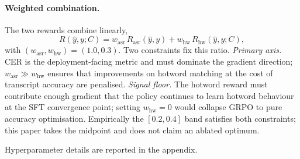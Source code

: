 \paragraph{Weighted combination.}
The two rewards combine linearly,
\begin{equation}
  R(\hat{y}, y; C) = w_\mathrm{asr}\, R_\mathrm{asr}(\hat{y}, y)
    + w_\mathrm{hw}\, R_\mathrm{hw}(\hat{y}, y; C),
  \label{eq:reward-total}
\end{equation}
with $(w_\mathrm{asr}, w_\mathrm{hw}) = (1.0, 0.3)$. Two
constraints fix this ratio. \emph{Primary axis.} CER is the
deployment-facing metric and must dominate the gradient direction;
$w_\mathrm{asr}\!\gg\!w_\mathrm{hw}$ ensures that improvements on
hotword matching at the cost of transcript accuracy are penalised.
\emph{Signal floor.} The hotword reward must contribute enough
gradient that the policy continues to learn hotword behaviour at
the SFT convergence point; setting $w_\mathrm{hw}=0$ would
collapse GRPO to pure accuracy optimisation. Empirically the
$[0.2, 0.4]$ band satisfies both constraints; this paper takes the
midpoint and does not claim an ablated optimum.

Hyperparameter details are reported in the appendix.
